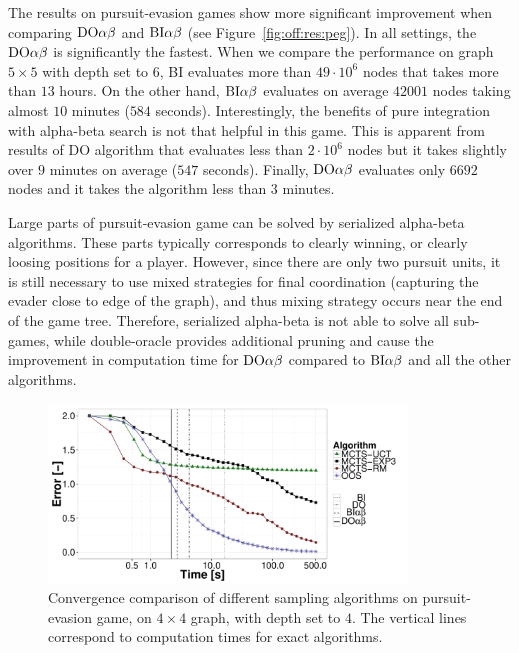 The results on pursuit-evasion games show more significant improvement when comparing $\textrm{DO}\alpha\beta$ and $\textrm{BI}\alpha\beta$ (see Figure~\ref{fig:off:res:peg}). In all settings, the $\textrm{DO}\alpha\beta$ is significantly the fastest. When we compare the performance on graph $5\times5$ with depth set to $6$, \textsc{BI} evaluates more than $49\cdot10^6$ nodes that takes more than $13$ hours. On the other hand, $\textrm{BI}\alpha\beta$ evaluates on average $42001$ nodes taking almost $10$ minutes ($584$ seconds). Interestingly, the benefits of pure integration with alpha-beta search is not that helpful in this game.
This is apparent from results of \textsc{DO} algorithm that evaluates less than $2\cdot10^6$ nodes but it takes slightly over $9$ minutes on average ($547$ seconds). Finally, $\textrm{DO}\alpha\beta$ evaluates only $6692$ nodes and it takes the algorithm less than $3$ minutes.

Large parts of pursuit-evasion game can be solved by serialized alpha-beta algorithms.
These parts typically corresponds to clearly winning, or clearly loosing positions for a player.
However, since there are only two pursuit units, it is still necessary to use mixed strategies for final coordination (capturing the evader close to edge of the graph), and thus mixing strategy occurs near the end of the game tree. 
Therefore, serialized alpha-beta is not able to solve all sub-games, while double-oracle provides additional pruning and cause the improvement in computation time for $\textrm{DO}\alpha\beta$ compared to $\textrm{BI}\alpha\beta$ and all the other algorithms.

\begin{figure}
\centering
\includegraphics[width=0.85\textwidth]{figures/convergence-peg.pdf}
\caption{Convergence comparison of different sampling algorithms on pursuit-evasion game, on $4\times4$ graph, with depth set to $4$. The vertical lines correspond to computation times for exact algorithms.} \label{fig:off:conv:peg}
\end{figure}

